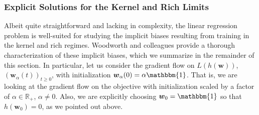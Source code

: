 \documentclass{article}
\begin{document}
\subsubsection{Explicit Solutions for the Kernel and Rich Limits}
Albeit quite straightforward and lacking in complexity, the linear regression problem is well-suited for studying the implicit biases resulting from training in the kernel and rich regimes. Woodworth and colleagues provide a thorough characterization of these implicit biases, which we summarize in the remainder of this section. In particular, let us consider the gradient flow on $L(h(\boldsymbol{w}))$, $(\boldsymbol{w}_{\alpha}(t))_{t \geq 0}$, with initialization $\boldsymbol{w}_{\alpha}(0) = \alpha \mathbbm{1}$. That is, we are looking at the gradient flow on the objective with initialization scaled by a factor of $\alpha \in \mathbb{R}_+$, $\alpha \neq 0$. Also, we are explicitly choosing $\boldsymbol{w}_0 = \mathbbm{1}$ so that $h(\boldsymbol{w}_0) = 0$, as we pointed out above.
\end{document}

